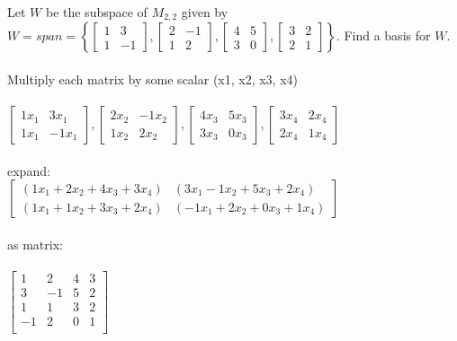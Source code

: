 \documentclass{article}
\begin{document}
Let $W$ be the subspace of $M_{2,2}$ given by $W=span=\left\{
\left[\begin{matrix} 1 & 3\\1 & -1 \end{matrix}\right],
\left[\begin{matrix} 2 & -1\\1 & 2 \end{matrix}\right],
\left[\begin{matrix} 4 & 5\\3 & 0 \end{matrix}\right],
\left[\begin{matrix} 3 & 2\\2 & 1 \end{matrix}\right]
\right\}$. Find a basis for $W$.\\
\\
Multiply each matrix by some scalar (x1, x2, x3, x4)\\
\\
$\left[\begin{matrix} 1x_{1} & 3x_{1}\\1x_{1} & -1x_{1} \end{matrix}\right],
\left[\begin{matrix} 2x_{2} & -1x_{2}\\1x_{2} & 2x_{2} \end{matrix}\right],
\left[\begin{matrix} 4x_{3} & 5x_{3}\\3x_{3} & 0x_{3} \end{matrix}\right],
\left[\begin{matrix} 3x_{4} & 2x_{4}\\2x_{4} & 1x_{4} \end{matrix}\right]$\\
\\
expand:\\
$\left[\begin{matrix} (1x_{1} + 2x_{2} + 4x_{3} + 3x_{4}) & (3x_{1} - 1x_{2} + 5x_{3} + 2x_{4})\\ (1x_{1} + 1x_{2} + 3x_{3} + 2x_{4}) & (-1x_{1} + 2x_{2} + 0x_{3} + 1x_{4}) \end{matrix}\right]$\\
\\
as matrix:\\
\\
$\left[\begin{matrix}
1 & 2 & 4 & 3 \\
3 & -1 & 5 & 2 \\
1 & 1 & 3 & 2 \\
-1 & 2 & 0 & 1 \\
\end{matrix}\right]$\\
\end{document}
